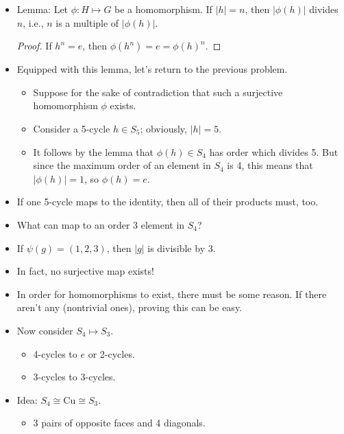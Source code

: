 \documentclass[../notes.tex]{subfiles}
\begin{document}
\begin{itemize}
\begin{itemize}
    \end{itemize}
    \item Lemma: Let $\phi:H\mapsto G$ be a homomorphism. If $|h|=n$, then $|\phi(h)|$ divides $n$, i.e., $n$ is a multiple of $|
    \phi(h)|$.
    \begin{proof}
        If $h^n=e$, then $\phi(h^n)=e=\phi(h)^n$.
    \end{proof}
    \item Equipped with this lemma, let's return to the previous problem.
    \begin{itemize}
        \item Suppose for the sake of contradiction that such a surjective homomorphism $\phi$ exists.
        \item Consider a 5-cycle $h\in S_5$; obviously, $|h|=5$.
        \item It follows by the lemma that $\phi(h)\in S_4$ has order which divides 5. But since the maximum order of an element in $S_4$ is 4, this means that $|\phi(h)|=1$, so $\phi(h)=e$.
    \end{itemize}
    \item If one 5-cycle maps to the identity, then all of their products must, too.
    \item What can map to an order 3 element in $S_4$?
    \item If $\psi(g)=(1,2,3)$, then $|g|$ is divisible by 3.
    \item In fact, no surjective map exists!
    \item In order for homomorphisms to exist, there must be some reason. If there aren't any (nontrivial ones), proving this can be easy.
    \item Now consider $S_4\mapsto S_3$.
    \begin{itemize}
        \item 4-cycles to $e$ or 2-cycles.
        \item 3-cycles to 3-cycles.
    \end{itemize}
    \item Idea: $S_4\cong\text{Cu}\cong S_3$.
    \begin{itemize}
        \item 3 pairs of opposite faces and 4 diagonals.
    \end{itemize}
\end{itemize}
\end{document}
